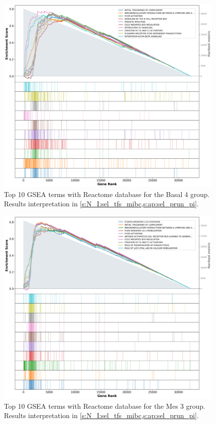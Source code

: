 \begin{figure}[!htb]
    \centering
    \includegraphics[width=\textwidth,keepaspectratio]{Sections/Network_I/Resources/selective_pruning/gsea/largeBasal_10_top_manTerms.png}
    \caption{Top 10 GSEA terms with Reactome database for the Basal 4 group. Results interpretation in \cref{s:N_I:sel_tfs_mibc,s:ap:sel_prun_pi}.}
    \label{fig:ap:gsea_largeBasal}
\end{figure}

\begin{figure}[!htb]
    \centering
    \includegraphics[width=\textwidth,keepaspectratio]{Sections/Network_I/Resources/selective_pruning/gsea/mesLike_10_top_manTerms.png}
    \caption{Top 10 GSEA terms with Reactome database for the Mes 3 group. Results interpretation in \cref{s:N_I:sel_tfs_mibc,s:ap:sel_prun_pi}.}
    \label{fig:ap:gsea_mesLike}
\end{figure}



